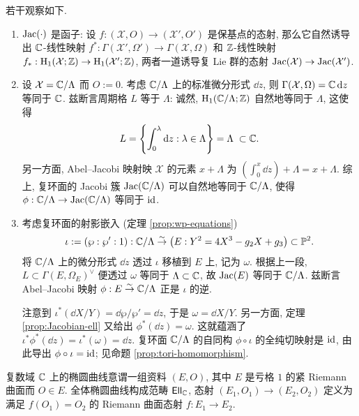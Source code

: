 若干观察如下.
\begin{enumerate}
	\item $\operatorname{Jac}(\cdot)$ 是函子: 设 $f: (\mathcal{X}, O) \to (\mathcal{X}' , O')$ 是保基点的态射, 那么它自然诱导出 $\mathbb{C}$-线性映射 $f^*: \Gamma(\mathcal{X}', \Omega') \to \Gamma(\mathcal{X}, \Omega)$ 和 $\mathbb{Z}$-线性映射 $f_*: \operatorname{H}_1(\mathcal{X}; \mathbb{Z}) \to \operatorname{H}_1(\mathcal{X}'; \mathbb{Z})$, 两者一道诱导复 Lie 群的态射 $\operatorname{Jac}(\mathcal{X}) \to \operatorname{Jac}(\mathcal{X}')$.
	\item 设 $\mathcal{X} = \mathbb{C}/\Lambda$ 而 $O := 0$. 考虑 $\mathbb{C}/\Lambda$ 上的标准微分形式 $\dd z$, 则 $\Gamma(\mathcal{X}, \Omega) = \mathbb{C}\mathop{}\!\mathrm{d} z$ 等同于 $\mathbb{C}$. 兹断言周期格 $L$ 等于 $\Lambda$: 诚然, $\operatorname{H}_1(\mathbb{C}/\Lambda; \mathbb{Z})$ 自然地等同于 $\Lambda$, 这使得
	\[ L = \left\{ \int_0^\lambda \mathop{}\!\mathrm{d} z : \lambda \in \Lambda \right\} = \Lambda \;\subset \mathbb{C}. \]
	另一方面, Abel--Jacobi 映射映 $\mathcal{X}$ 的元素 $x + \Lambda$ 为 $(\int_0^x \dd z) + \Lambda = x + \Lambda$. 综上, 复环面的 Jacobi 簇 $\operatorname{Jac}(\mathbb{C}/\Lambda)$ 可以自然地等同于 $\mathbb{C}/\Lambda$, 使得 $\phi: \mathbb{C}/\Lambda \to \operatorname{Jac}(\mathbb{C}/\Lambda)$ 等同于 $\mathrm{id}$.
	\item 考虑复环面的射影嵌入 (定理 \ref{prop:wp-equations})
	\[ \iota := (\wp:\wp':1): \mathbb{C}/\Lambda \stackrel{\sim}{\rightarrow} \left( E: Y^2 = 4X^3 - g_2 X + g_3 \right) \subset \mathbb{P}^2. \]
	将 $\mathbb{C}/\Lambda$ 上的微分形式 $\dd z$ 透过 $\iota$ 移植到 $E$ 上, 记为 $\omega$. 根据上一段, $L \subset \Gamma(E, \Omega_E)^\vee$ 便透过 $\omega$ 等同于 $\Lambda \subset \mathbb{C}$, 故 $\operatorname{Jac}(E)$ 等同于 $\mathbb{C}/\Lambda$. 兹断言 Abel--Jacobi 映射 $\phi: E \stackrel{\sim}{\rightarrow} \mathbb{C}/\Lambda$ 正是 $\iota$ 的逆.
	
	注意到 $\iota^*\left( \dd X/Y \right) = \dd\wp / \wp' = \dd z$, 于是 $\omega = \dd X /Y$. 另一方面, 定理 \ref{prop:Jacobian-ell} 又给出 $\phi^*(\dd z) = \omega$. 这就蕴涵了 $\iota^* \phi^*(\dd z) = \iota^*(\omega) = \dd z$. 复环面 $\mathbb{C}/\Lambda$ 的自同构 $\phi \circ \iota$ 的全纯切映射是 $\mathrm{id}$, 由此导出 $\phi \circ \iota = \mathrm{id}$; 见命题 \ref{prop:tori-homomorphism}.
\end{enumerate}

\begin{definition}[椭圆曲线]\label{def:elliptic-curves}
	 
	复数域 $\mathbb{C}$ 上的椭圆曲线意谓一组资料 $(E, O)$, 其中 $E$ 是亏格 $1$ 的紧 Riemann 曲面而 $O \in E$. 全体椭圆曲线构成范畴 $\mathsf{Ell}_{\mathbb{C}}$, 态射 $(E_1, O_1) \to (E_2, O_2)$ 定义为满足 $f(O_1) = O_2$ 的 Riemann 曲面态射 $f: E_1 \to E_2$.
\end{definition}

